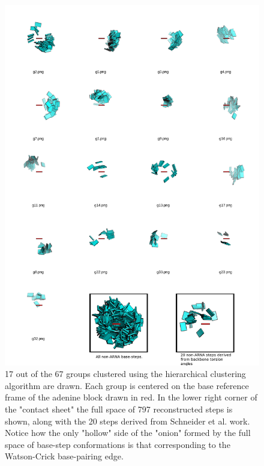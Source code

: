 \begin{figure}
\centering
\includegraphics[angle=0, scale=0.35]{Chapter2/k67_17.png}
\caption{17  out of  the 67  groups clustered  using  the hierarchical
  clustering algorithm are  drawn. Each group is centered  on the base
  reference frame  of the  adenine block drawn  in red.  In  the lower
  right  corner  of  the  "contact   sheet"  the  full  space  of  797
  reconstructed steps is  shown, along with the 20  steps derived from
  Schneider  et al. work.  Notice how  the only  "hollow" side  of the
  "onion" formed by the full  space of base-step conformations is that
  corresponding to the Watson-Crick base-pairing edge.}
\label{fig:noarnak67}
\end{figure}

